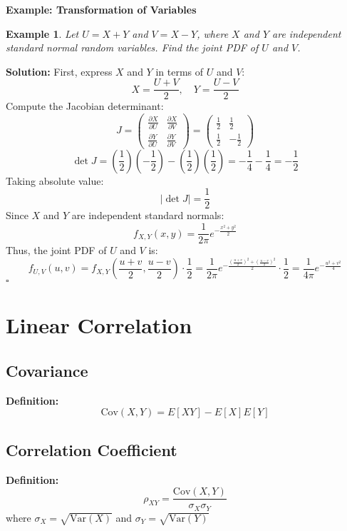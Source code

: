\documentclass[12pt]{article}
\newtheorem{example}{Example}
\newenvironment{solution}{\noindent\textbf{Solution:}}{\hfill$\square$}
\begin{document}
\textbf{Example: Transformation of Variables}
\begin{example}
Let \( U = X + Y \) and \( V = X - Y \), where \( X \) and \( Y \) are independent standard normal random variables. Find the joint PDF of \( U \) and \( V \).
\end{example}
\begin{solution}
First, express \( X \) and \( Y \) in terms of \( U \) and \( V \):
\[
X = \frac{U + V}{2}, \quad Y = \frac{U - V}{2}
\]
Compute the Jacobian determinant:
\[
J = 
\begin{pmatrix}
\frac{\partial X}{\partial U} & \frac{\partial X}{\partial V} \\
\frac{\partial Y}{\partial U} & \frac{\partial Y}{\partial V}
\end{pmatrix}
= 
\begin{pmatrix}
\frac{1}{2} & \frac{1}{2} \\
\frac{1}{2} & -\frac{1}{2}
\end{pmatrix}
\]
\[
\det J = \left(\frac{1}{2}\right)\left(-\frac{1}{2}\right) - \left(\frac{1}{2}\right)\left(\frac{1}{2}\right) = -\frac{1}{4} - \frac{1}{4} = -\frac{1}{2}
\]
Taking absolute value:
\[
\left| \det J \right| = \frac{1}{2}
\]
Since \( X \) and \( Y \) are independent standard normals:
\[
f_{X,Y}(x,y) = \frac{1}{2\pi} e^{-\frac{x^2 + y^2}{2}}
\]
Thus, the joint PDF of \( U \) and \( V \) is:
\[
f_{U,V}(u,v) = f_{X,Y}\left(\frac{u+v}{2}, \frac{u-v}{2}\right) \cdot \frac{1}{2} = \frac{1}{2\pi} e^{-\frac{\left(\frac{u+v}{2}\right)^2 + \left(\frac{u-v}{2}\right)^2}{2}} \cdot \frac{1}{2} = \frac{1}{4\pi} e^{-\frac{u^2 + v^2}{4}}
\]
\end{solution}

\section{Linear Correlation}
\subsection{Covariance}
\textbf{Definition:}
\[
\text{Cov}(X,Y) = E[XY] - E[X]E[Y]
\]

\subsection{Correlation Coefficient}
\textbf{Definition:}
\[
\rho_{XY} = \frac{\text{Cov}(X,Y)}{\sigma_X \sigma_Y}
\]
where \( \sigma_X = \sqrt{\text{Var}(X)} \) and \( \sigma_Y = \sqrt{\text{Var}(Y)} \)
\end{document}
